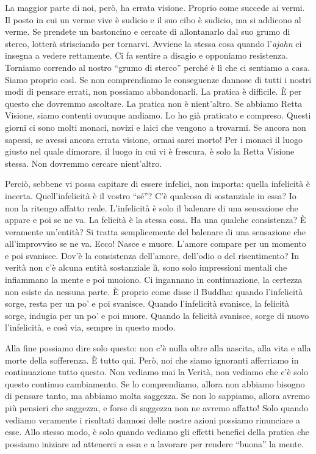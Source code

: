 La maggior parte di noi, però, ha errata visione. Proprio come succede
ai vermi. Il posto in cui un verme vive è sudicio e il suo cibo è
sudicio, ma si addicono al verme. Se prendete un bastoncino e cercate di
allontanarlo dal suo grumo di sterco, lotterà strisciando per tornarvi.
Avviene la stessa cosa quando l'\emph{ajahn} ci insegna a vedere
rettamente. Ci fa sentire a disagio e opponiamo resistenza. Torniamo
correndo al nostro ``grumo di sterco'' perché è lì che ci sentiamo a
casa. Siamo proprio così. Se non comprendiamo le conseguenze dannose di
tutti i nostri modi di pensare errati, non possiamo abbandonarli. La
pratica è difficile. È per questo che dovremmo ascoltare. La pratica non
è nient'altro. Se abbiamo Retta Visione, siamo contenti ovunque andiamo.
Lo ho già praticato e compreso. Questi giorni ci sono molti monaci,
novizi e laici che vengono a trovarmi. Se ancora non sapessi, se avessi
ancora errata visione, ormai sarei morto! Per i monaci il luogo giusto
nel quale dimorare, il luogo in cui vi è frescura, è solo la Retta
Visione stessa. Non dovremmo cercare nient'altro.

Perciò, sebbene vi possa capitare di essere infelici, non importa:
quella infelicità è incerta. Quell'infelicità è il vostro ``sé''? C'è
qualcosa di sostanziale in essa? Io non la ritengo affatto reale.
L'infelicità è solo il balenare di una sensazione che appare e poi se ne
va. La felicità è la stessa cosa. Ha una qualche consistenza? È
veramente un'entità? Si tratta semplicemente del balenare di una
sensazione che all'improvviso se ne va. Ecco! Nasce e muore. L'amore
compare per un momento e poi svanisce. Dov'è la consistenza dell'amore,
dell'odio o del risentimento? In verità non c'è alcuna entità
sostanziale lì, sono solo impressioni mentali che infiammano la mente e
poi muoiono. Ci ingannano in continuazione, la certezza non esiste da
nessuna parte. È proprio come disse il Buddha: quando l'infelicità
sorge, resta per un po' e poi svanisce. Quando l'infelicità svanisce, la
felicità sorge, indugia per un po' e poi muore. Quando la felicità
svanisce, sorge di nuovo l'infelicità, e così via, sempre in questo
modo.

Alla fine possiamo dire solo questo: non c'è nulla oltre alla nascita,
alla vita e alla morte della sofferenza. È tutto qui. Però, noi che
siamo ignoranti afferriamo in continuazione tutto questo. Non vediamo
mai la Verità, non vediamo che c'è solo questo continuo cambiamento. Se
lo comprendiamo, allora non abbiamo bisogno di pensare tanto, ma abbiamo
molta saggezza. Se non lo sappiamo, allora avremo più pensieri che
saggezza, e forse di saggezza non ne avremo affatto! Solo quando vediamo
veramente i risultati dannosi delle nostre azioni possiamo rinunciare a
esse. Allo stesso modo, è solo quando vediamo gli effetti benefici della
pratica che possiamo iniziare ad attenerci a essa e a lavorare per
rendere ``buona'' la mente.

